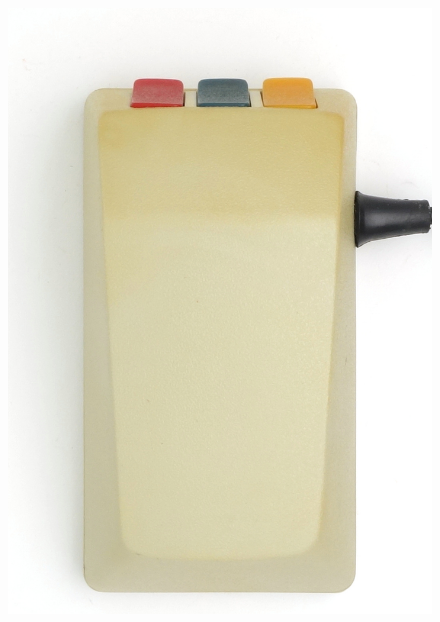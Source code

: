 \documentclass[11pt, a4paper]{article}
\begin{document}
\begin{figure}[h]
    \centering
    \includegraphics[scale=0.75]{1985_smc_contriver_magic_mouse/top_30.jpg}

\end{figure}
\end{document}
